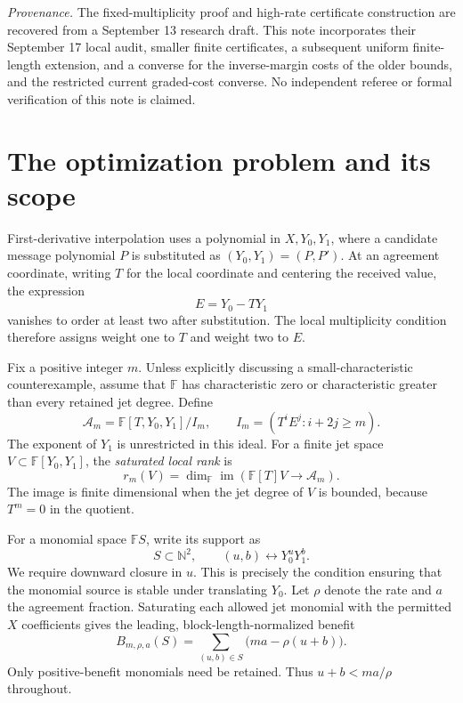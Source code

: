 \documentclass[11pt]{article}
\theoremstyle{remark}\newtheorem{remark}[theorem]{Remark}
\newcommand{\N}{\mathbb N}
\newcommand{\im}{\operatorname{im}}
\begin{document}
\noindent\textit{Provenance.} The fixed-multiplicity proof and high-rate
certificate construction are recovered from a September 13 research draft.
This note incorporates their September 17 local audit, smaller finite
certificates, a subsequent uniform finite-length extension, and a
converse for the inverse-margin costs of the older bounds, and the
restricted current graded-cost converse. No independent referee or formal verification
of this note is claimed.

\section{The optimization problem and its scope}

First-derivative interpolation uses a polynomial in $X,Y_0,Y_1$, where a candidate message polynomial $P$ is substituted as $(Y_0,Y_1)=(P,P')$. At an agreement coordinate, writing $T$ for the local coordinate and centering the received value, the expression
\[
 E=Y_0-TY_1
\]
vanishes to order at least two after substitution. The local multiplicity condition therefore assigns weight one to $T$ and weight two to $E$.

Fix a positive integer $m$. Unless explicitly discussing a small-characteristic counterexample, assume that $\mathbb F$ has characteristic zero or characteristic greater than every retained jet degree. Define
\[
 \mathcal A_m=\mathbb F[T,Y_0,Y_1]/I_m,
 \qquad I_m=(T^iE^j:i+2j\ge m).
\]
The exponent of $Y_1$ is unrestricted in this ideal. For a finite jet space $V\subset \mathbb F[Y_0,Y_1]$, the \emph{saturated local rank} is
\[
 r_m(V)=\dim_{\mathbb F}\im(\mathbb F[T]V\longrightarrow\mathcal A_m).
\]
The image is finite dimensional when the jet degree of $V$ is bounded, because $T^m=0$ in the quotient.

For a monomial space $\mathbb F S$, write its support as
\[
 S\subset\N^2,\qquad (u,b)\leftrightarrow Y_0^uY_1^b.
\]
We require downward closure in $u$. This is precisely the condition ensuring that the monomial source is stable under translating $Y_0$. Let $\rho$ denote the rate and $a$ the agreement fraction. Saturating each allowed jet monomial with the permitted $X$ coefficients gives the leading, block-length-normalized benefit
\begin{equation}\label{eq:benefit}
 B_{m,\rho,a}(S)=\sum_{(u,b)\in S}\bigl(ma-\rho(u+b)\bigr).
\end{equation}
Only positive-benefit monomials need be retained. Thus $u+b<ma/\rho$ throughout.
\end{document}
